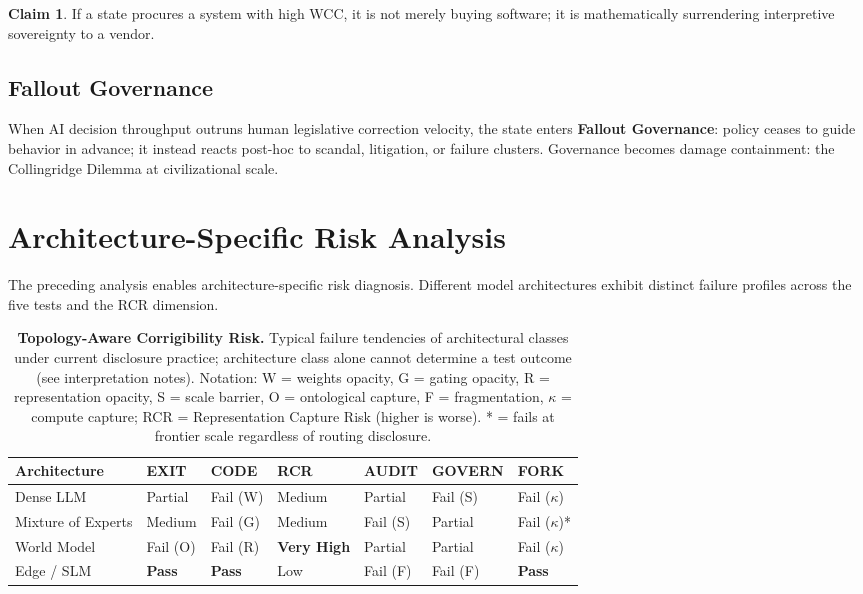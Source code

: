 \documentclass{article}
\theoremstyle{definition}
\newtheorem{claim}{Claim}[section]
\begin{document}
\begin{claim}
If a state procures a system with high WCC, it is not merely buying software; it is mathematically surrendering interpretive sovereignty to a vendor.
\end{claim}

\subsection{Fallout Governance}

When AI decision throughput outruns human legislative correction velocity, the state enters \textbf{Fallout Governance}: policy ceases to guide behavior in advance; it instead reacts post-hoc to scandal, litigation, or failure clusters. Governance becomes damage containment: the Collingridge Dilemma \citep{collingridge1980} at civilizational scale.


\section{Architecture-Specific Risk Analysis}
\label{sec:architecture}

The preceding analysis enables architecture-specific risk diagnosis. Different model architectures exhibit distinct failure profiles across the five tests and the RCR dimension.

\begin{table}[htbp]
\centering
\caption{\textbf{Topology-Aware Corrigibility Risk.} Typical failure tendencies of architectural classes under current disclosure practice; architecture class alone cannot determine a test outcome (see interpretation notes). Notation: W = weights opacity, G = gating opacity, R = representation opacity, S = scale barrier, O = ontological capture, F = fragmentation, $\kappa$ = compute capture; RCR = Representation Capture Risk (higher is worse). * = fails at frontier scale regardless of routing disclosure.}
\label{tab:topology-risk-arch}
\small
\begin{tabular}{@{}lllllll@{}}
\toprule
\textbf{Architecture} & \textbf{EXIT} & \textbf{CODE} & \textbf{RCR} & \textbf{AUDIT} & \textbf{GOVERN} & \textbf{FORK} \\
\midrule
Dense LLM & Partial & Fail (W) & Medium & Partial & Fail (S) & Fail ($\kappa$) \\
Mixture of Experts & Medium & Fail (G) & Medium & Fail (S) & Partial & Fail ($\kappa$)* \\
World Model & Fail (O) & Fail (R) & \textbf{Very High} & Partial & Partial & Fail ($\kappa$) \\
Edge / SLM & \textbf{Pass} & \textbf{Pass} & Low & Fail (F) & Fail (F) & \textbf{Pass} \\
\bottomrule
\end{tabular}
\end{table}
\end{document}
